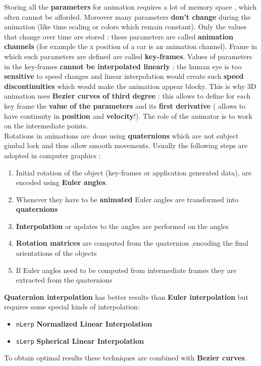Storing all the \textbf{parameters} for animation requires a lot of memory space , which often cannot be afforded. Moreover many parameters \textbf{don't change} during the animation (like time scaling or colors which remain constant). Only the values that change over time are stored : these parameters are called \textbf{animation channels} (for example the x position of a car is an animation channel). Frame in which such parameters are defined are called \textbf{key-frames}. Values of parameters in the key-frames \textbf{cannot be interpolated linearly} : the human eye is too \textbf{sensitive} to speed changes and linear interpolation would create such\textbf{ speed discontinuities } which would make the animation appear blocky. This is why 3D animation uses \textbf{Bezier curves of third degree} : this allows to define for each key frame the \textbf{value of the parameters} and its \textbf{first derivative} ( allows to have continuity in \textbf{position} and \textbf{velocity}!). The role of the animator is to work on the intermediate points.\\ Rotations in animations are done using \textbf{quaternions} which are not subject gimbal lock and thus allow smooth movements. Usually the following steps are adopted in computer graphics : 
\begin{enumerate}
\item Initial rotation of the object (key-frames or application generated data), are encoded using \textbf{Euler angles}.
\item Whenever they have to be \textbf{animated} Euler angles are transformed into \textbf{quaternions}
\item \textbf{Interpolation} or updates to the angles are performed on the angles
\item \textbf{Rotation matrices} are computed from the quaternion ,encoding the final orientations of the objects
\item If Euler angles need to be computed from intermediate frames they are extracted from the quaternions
\end{enumerate}
\textbf{Quaternion interpolation} has better results than \textbf{Euler interpolation} but requires some special kinds of interpolation:
\begin{itemize}
\item \texttt{nLerp} \textbf{Normalized Linear Interpolation}
\item \texttt{sLerp} \textbf{Spherical Linear Interpolation}
\end{itemize}
To obtain optimal results these techniques are combined with \textbf{Bezier curves}.